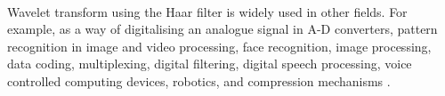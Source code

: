 \paragraph{}
Wavelet transform using the Haar filter is widely used in other fields. For
example, as a way of digitalising an analogue signal in A-D converters, pattern
recognition in image and video processing, face recognition, image processing,
data coding, multiplexing, digital filtering, digital speech processing, voice
controlled computing devices, robotics, and compression mechanisms \cite{khan,
stankovic, wadkar}.

\begin{comment}
- Literature study
- Software evolution
- Project success
- Project survivability

This chapter contains all the information needed to put the thesis into
context. It is common to use (a revised version) of your literature survey for
this purpose.

It is important to refer from your text to sources you have used, as listed in
your bibliography section (appendix). For example, “XP is a recent agile
development method [1]” is a common style of doing this, where the following
entry would be included in your bibliography:
[1] K. Beck, E. Gamma, Test infected: Programmers love writing tests, Java
Report 3 (7) (1998) 51–56.

If you want to refer to books you have read as part of the curriculum, you can
also do so in this way.

Have a look at Chapter 2 of this example thesis at Paul’s
homepage\footnote{http://homepages.cwi.nl/~paulk/thesesMasterSoftwareEngineering/2006/RichardKettelerij.pdf}.
\end{comment}